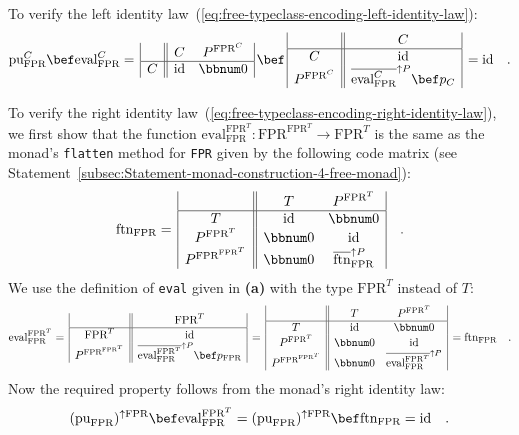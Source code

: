 To verify the left identity law~(\ref{eq:free-typeclass-encoding-left-identity-law}):
\[
\text{pu}_{\text{FPR}}^{C}\bef\text{eval}_{\text{FPR}}^{C}=\,\begin{array}{|c||cc|}
 & C & P^{\text{FPR}^{C}}\\
\hline C & \text{id} & \bbnum 0
\end{array}\,\bef\,\begin{array}{|c||c|}
 & C\\
\hline C & \text{id}\\
P^{\text{FPR}^{C}} & \overline{\text{eval}_{\text{FPR}}^{C}}^{\uparrow P}\bef p_{C}
\end{array}\,=\text{id}\quad.
\]

To verify the right identity law~(\ref{eq:free-typeclass-encoding-right-identity-law}),
we first show that the function $\text{eval}_{\text{FPR}}^{\text{FPR}^{T}}:\text{FPR}^{\text{FPR}^{T}}\rightarrow\text{FPR}^{T}$
is the same as the monad\textsf{'}s \lstinline!flatten!
method for \lstinline!FPR!
given by the following code matrix (see Statement~\ref{subsec:Statement-monad-construction-4-free-monad}):
\[
\text{ftn}_{\text{FPR}}=\,\begin{array}{|c||cc|}
 & T & P^{\text{FPR}^{T}}\\
\hline T & \text{id} & \bbnum 0\\
P^{\text{FPR}^{T}} & \bbnum 0 & \text{id}\\
P^{\text{FPR}^{\text{FPR}^{T}}} & \bbnum 0 & \overline{\text{ftn}}_{\text{FPR}}^{\uparrow P}
\end{array}\quad.
\]
We use the definition of \lstinline!eval!
given in \textbf{(a)} with the type $\text{FPR}^{T}$ instead of $T$:
\[
\text{eval}_{\text{FPR}}^{\text{FPR}^{T}}=\,\begin{array}{|c||c|}
 & \text{FPR}^{T}\\
\hline \text{FPR}^{T} & \text{id}\\
P^{\text{FPR}^{\text{FPR}^{T}}} & \overline{\text{eval}_{\text{FPR}}^{\text{FPR}^{T}}}^{\uparrow P}\bef p_{\text{FPR}}
\end{array}\,=\,\begin{array}{|c||cc|}
 & T & P^{\text{FPR}^{T}}\\
\hline T & \text{id} & \bbnum 0\\
P^{\text{FPR}^{T}} & \bbnum 0 & \text{id}\\
P^{\text{FPR}^{\text{FPR}^{T}}} & \bbnum 0 & \overline{\text{eval}_{\text{FPR}}^{\text{FPR}^{T}}}^{\uparrow P}
\end{array}\,=\text{ftn}_{\text{FPR}}\quad.
\]
Now the required property follows from the monad\textsf{'}s right identity
law:
\[
(\text{pu}_{\text{FPR}})^{\uparrow\text{FPR}}\bef\text{eval}_{\text{FPR}}^{\text{FPR}^{T}}=(\text{pu}_{\text{FPR}})^{\uparrow\text{FPR}}\bef\text{ftn}_{\text{FPR}}=\text{id}\quad.
\]

